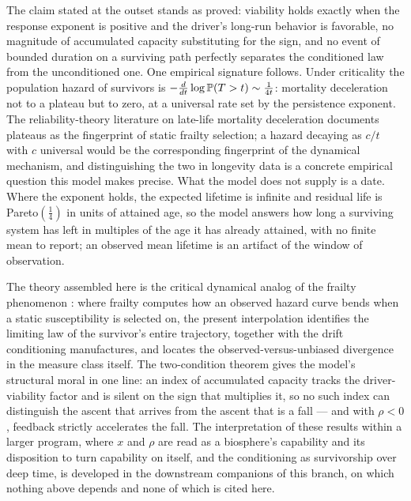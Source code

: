 The claim stated at the outset stands as proved: viability holds
exactly when the response exponent is positive and the driver's
long-run behavior is favorable, no magnitude of accumulated capacity
substituting for the sign, and no event of bounded duration on a surviving
path perfectly separates the conditioned law from the unconditioned
one. One
empirical signature follows. Under criticality the
population hazard of survivors is $-\frac{d}{dt}\log\mathbb{P}(T>t)\sim
\frac{1}{4t}$: mortality deceleration not to a plateau but to zero, at
a universal rate set by the persistence exponent. The
reliability-theory literature on late-life mortality deceleration
\cite{GG01} documents plateaus as the fingerprint of static frailty
selection; a hazard decaying as $c/t$ with $c$ universal would be the
corresponding fingerprint of the dynamical mechanism, and
distinguishing the two in longevity data is a concrete empirical
question this model makes precise.
What the model does not supply is a date. Where the exponent holds, the
expected lifetime is infinite and residual life is Pareto$(\tfrac14)$ in
units of attained age, so the model answers how long a surviving system
has left in multiples of the age it has already attained, with no finite
mean to report; an observed mean lifetime is an artifact of the window
of observation.

The theory assembled here is the critical dynamical analog of the
frailty phenomenon \cite{VMS79,VY85}: where frailty computes how an
observed hazard curve bends when a static susceptibility is selected
on, the present interpolation identifies the limiting law of the
survivor's entire trajectory, together with the drift conditioning
manufactures, and locates the observed-versus-unbiased divergence in
the measure class itself. The two-condition theorem gives the model's
structural moral in one line: an index of accumulated capacity tracks
the driver-viability factor and is silent on the sign that multiplies it, so
no such index can distinguish the ascent that arrives from the ascent
that is a fall --- and with $\rho<0$, feedback strictly accelerates
the fall. The interpretation of these results within a larger program, where $x$ and $\rho$ are read as a biosphere's capability and its
disposition to turn capability on itself, and the conditioning as
survivorship over deep time, is developed in the downstream companions of this branch, on which
nothing above depends and none of which is cited here.

